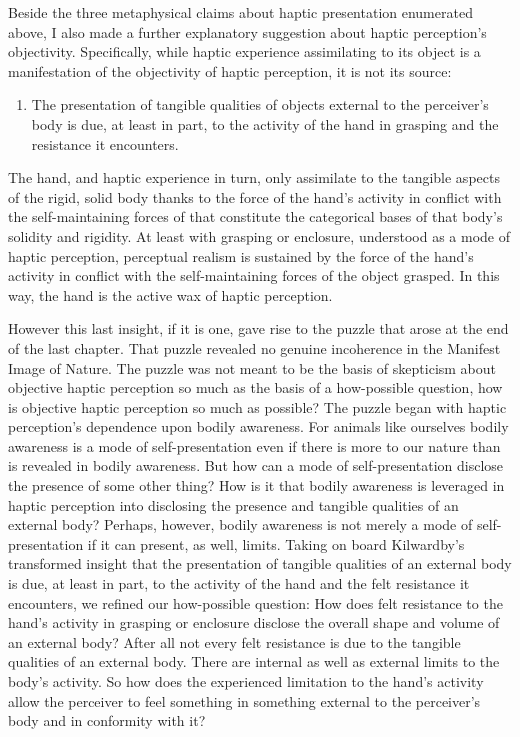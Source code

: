 Beside the three metaphysical claims about haptic presentation enumerated above, I also made a further explanatory suggestion about haptic perception's objectivity. Specifically, while haptic experience assimilating to its object is a manifestation of the objectivity of haptic perception, it is not its source: 
\begin{enumerate}[(4)]
	\item The presentation of tangible qualities of objects external to the perceiver’s body is due, at least in part, to the activity of the hand in grasping and the resistance it encounters.
\end{enumerate}
The hand, and haptic experience in turn, only assimilate to the tangible aspects of the rigid, solid body thanks to the force of the hand’s activity in conflict with the self-maintaining forces of that constitute the categorical bases of that body’s solidity and rigidity. At least with grasping or enclosure, understood as a mode of haptic perception, perceptual realism is sustained by the force of the hand’s activity in conflict with the self-maintaining forces of the object grasped. In this way, the hand is the active wax of haptic perception.

However this last insight, if it is one, gave rise to the puzzle that arose at the end of the last chapter. That puzzle revealed no genuine incoherence in the Manifest Image of Nature. The puzzle was not meant to be the basis of skepticism about objective haptic perception so much as the basis of a how-possible question, how is objective haptic perception so much as possible? The puzzle began with haptic perception's dependence upon bodily awareness. For animals like ourselves bodily awareness is a mode of self-presentation even if there is more to our nature than is revealed in bodily awareness. But how can a mode of self-presentation disclose the presence of some other thing? How is it that bodily awareness is leveraged in haptic perception into disclosing the presence and tangible qualities of an external body? Perhaps, however, bodily awareness is not merely a mode of self-presentation if it can present, as well, limits. Taking on board Kilwardby's transformed insight that the presentation of tangible qualities of an external body is due, at least in part, to the activity of the hand and the felt resistance it encounters, we refined our how-possible question: How does felt resistance to the hand's activity in grasping or enclosure disclose the overall shape and volume of an external body? After all not every felt resistance is due to the tangible qualities of an external body. There are internal as well as external limits to the body's activity. So how does the experienced limitation to the hand's activity allow the perceiver to feel something in something external to the perceiver's body and in conformity with it?

